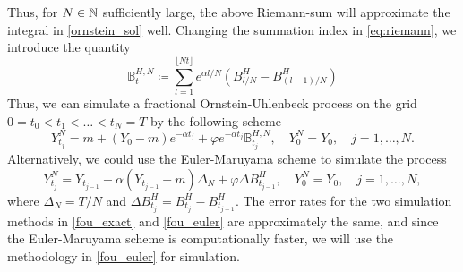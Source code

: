 Thus, for $N\in\mathbb{N}$ sufficiently large, the above Riemann-sum will approximate the integral in \eqref{ornstein_sol} well. Changing the summation index in \eqref{eq:riemann}, we introduce the quantity
\begin{equation}
    \mathbb{B}_{t}^{H,N}\coloneqq \sum_{l=1}^{\lfloor Nt\rfloor }e^{\alpha l/N}\left(B^{H}_{l/N}-B^{H}_{(l-1)/N}\right)
\end{equation}
Thus, we can simulate a fractional Ornstein-Uhlenbeck process on the grid $0=t_{0}<t_{1}<\dots<t_{N}=T$ by the following scheme
\begin{equation}\label{fou_exact}
    Y_{t_{j}}^{N}=m + (Y_{0}-m)e^{-\alpha t_{j}} + \varphi e^{-\alpha t_{j}}\mathbb{B}_{t_{j}}^{H,N},\quad Y_{0}^{N}=Y_{0}, \quad j=1,\dots,N.
\end{equation}
Alternatively, we could use the Euler-Maruyama scheme to simulate the process
\begin{equation}\label{fou_euler}
    Y_{t_{j}}^{N}=Y_{t_{j-1}} -\alpha(Y_{t_{j-1}}-m)\Delta_{N} + \varphi\Delta B_{t_{j-1}}^{H},\quad Y_{0}^{N}=Y_{0},\quad j=1,\dots,N,
\end{equation}
where $\Delta_{N}=T/N$ and $\Delta B_{t_{j}}^{H}=B^{H}_{t_{j}}-B^{H}_{t_{j-1}}$. The error rates for the two simulation methods in \eqref{fou_exact} and \eqref{fou_euler} are approximately the same, and since the Euler-Maruyama scheme is computationally faster, we will use the methodology in \eqref{fou_euler} for simulation.

